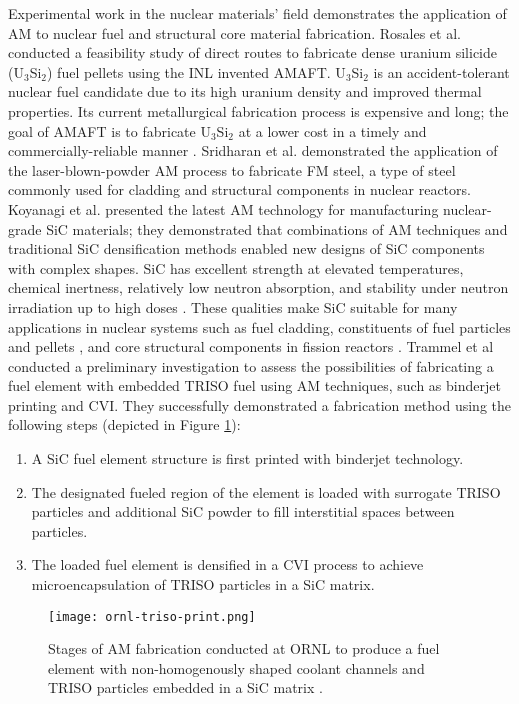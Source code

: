 Experimental work in the nuclear materials' field demonstrates the application 
of \gls{AM} to nuclear fuel and structural core material fabrication. 
Rosales et al. \cite{rosales_characterizing_2019} conducted a feasibility study 
of direct routes to fabricate dense uranium silicide (U$_3$Si$_2$) fuel pellets 
using the \gls{INL} invented \gls{AMAFT}. 
U$_3$Si$_2$ is an accident-tolerant nuclear fuel candidate due to its
high uranium density and improved thermal properties. 
Its current metallurgical fabrication process is expensive and long; the goal of
\gls{AMAFT} is to fabricate U$_3$Si$_2$ at a lower cost in a timely and
commercially-reliable manner \cite{rosales_characterizing_2019}.  
Sridharan et al. \cite{sridharan_performance_2019} demonstrated the application of
the laser-blown-powder \gls{AM} process to fabricate \gls{FM} steel, a type of 
steel commonly used for cladding and structural components in nuclear reactors. 
Koyanagi et al. \cite{koyanagi_additive_2020} presented the latest 
\gls{AM} technology for manufacturing nuclear-grade \gls{SiC} materials; they 
demonstrated that combinations of \gls{AM} techniques and traditional \gls{SiC} 
densification methods enabled new designs of \gls{SiC} components with complex shapes. 
\gls{SiC} has excellent strength at elevated temperatures, chemical inertness, 
relatively low neutron absorption, and stability under neutron irradiation up 
to high doses \cite{sauder_ceramic_2014, snead_handbook_2007,koyanagi_additive_2020}. 
These qualities make \gls{SiC} suitable for many applications in nuclear systems 
such as fuel cladding, constituents of fuel particles \cite{snead_handbook_2007} 
and pellets \cite{terrani_progress_2015}, and core structural components in fission 
reactors \cite{sauder_ceramic_2014}. 
Trammel et al \cite{trammell_advanced_2019} conducted a preliminary investigation 
to assess the possibilities of fabricating a fuel element with embedded 
\gls{TRISO} fuel using \gls{AM} techniques, such as binderjet printing and \gls{CVI}. 
They successfully demonstrated a fabrication method using the following steps 
(depicted in Figure \ref{fig:ornl-triso-print}): 
\begin{enumerate}
    \item A SiC fuel element structure is first printed with binderjet technology. 
    \item The designated fueled region of the element is loaded with surrogate 
    \gls{TRISO} particles and additional SiC powder to fill interstitial spaces
    between particles. 
    \item The loaded fuel element is densified in a \gls{CVI} process to achieve 
    microencapsulation of \gls{TRISO} particles in a SiC matrix. 
\end{enumerate}
\begin{figure}[]
    \centering
    \texttt{[image: ornl-triso-print.png]} 
    \caption{Stages of \gls{AM} fabrication conducted at \acrlong{ORNL} to 
    produce a fuel element with non-homogenously shaped coolant channels and
    \gls{TRISO} particles embedded in a SiC matrix \cite{trammell_advanced_2019}.}
    \label{fig:ornl-triso-print}
\end{figure}

